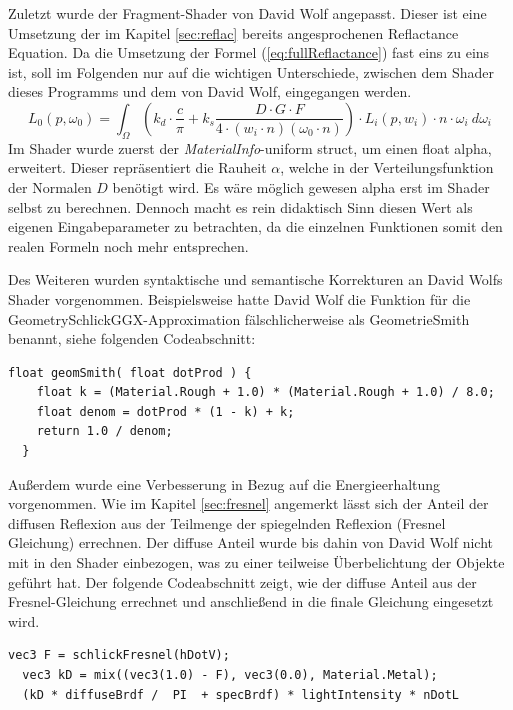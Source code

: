 \documentclass[
  11pt,
  a4paper,
  oneside
  ]{article}
\begin{document}
Zuletzt wurde der Fragment-Shader von David Wolf angepasst. Dieser ist eine Umsetzung der im Kapitel \ref{sec:reflac} bereits angesprochenen Reflactance Equation. Da die Umsetzung der Formel (\ref{eq:fullReflactance}) fast eins zu eins ist, soll im Folgenden nur auf die wichtigen Unterschiede, zwischen dem Shader dieses Programms und dem von David Wolf, eingegangen werden. 
\begin{equation}\label{eq:fullReflactance}
  L_{0}\left( p,\omega _{0}\right) =\int _{\Omega }^{}\left( k_{d}\cdot \dfrac{c}{\pi }+k_{s}\dfrac{D\cdot G\cdot F}{4\cdot \left( w_{i}\cdot n\right) \left( \omega _{0}\cdot n\right) }\right) \cdot L_{i}\left( p,w_{i}\right) \cdot n\cdot \omega _{i} \ d\omega _{i}
\end{equation} 
Im Shader wurde zuerst der \textit{MaterialInfo}-uniform struct, um einen float alpha, erweitert. Dieser repräsentiert die Rauheit $\alpha$, welche in der Verteilungsfunktion der Normalen $D$ benötigt wird. Es wäre möglich gewesen alpha erst im Shader selbst zu berechnen. Dennoch macht es rein didaktisch Sinn diesen Wert als eigenen Eingabeparameter zu betrachten, da die einzelnen Funktionen somit den realen Formeln noch mehr entsprechen. 

Des Weiteren wurden syntaktische und semantische Korrekturen an David Wolfs Shader vorgenommen. Beispielsweise hatte David Wolf die Funktion für die Geometry\-SchlickGGX-Approximation fälschlicherweise als GeometrieSmith benannt, siehe folgenden Codeabschnitt:
\begin{lstlisting}[tabsize=2, caption={Geometrie-Funktion aus dem Fragment-Shader von David Wolf}]
  float geomSmith( float dotProd ) {
    float k = (Material.Rough + 1.0) * (Material.Rough + 1.0) / 8.0;
    float denom = dotProd * (1 - k) + k;
    return 1.0 / denom;
  }
\end{lstlisting}

Außerdem wurde eine Verbesserung in Bezug auf die Energieerhaltung vorgenommen. Wie im Kapitel \ref{sec:fresnel} angemerkt lässt sich der Anteil der diffusen Reflexion aus der Teilmenge der spiegelnden Reflexion (Fresnel Gleichung) errechnen. Der diffuse Anteil wurde bis dahin von David Wolf nicht mit in den Shader einbezogen, was zu einer teilweise Überbelichtung der Objekte geführt hat. Der folgende Codeabschnitt zeigt, wie der diffuse Anteil aus der Fresnel-Gleichung errechnet und anschließend in die finale Gleichung eingesetzt wird.
\begin{lstlisting}[tabsize=2, caption={Quellcode zur Berechnung des Anteiles der diffusen Strahlung}]
  vec3 F = schlickFresnel(hDotV);         
  vec3 kD = mix((vec3(1.0) - F), vec3(0.0), Material.Metal);
  (kD * diffuseBrdf /  PI  + specBrdf) * lightIntensity * nDotL
\end{lstlisting}
\end{document}
